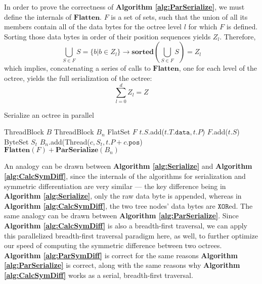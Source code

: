 \documentclass[twoside,twocolumn]{article}
\begin{document}
In order to prove the correctness of \textbf{Algorithm \ref{alg:ParSerialize}}, we must define the
internals of $\mathbf{Flatten}$. $F$ is a set of sets, such that the union of all its members contain all
of the data bytes for the octree level $l$ for which $F$ is defined. Sorting those data bytes in order
of their position sequences yields $Z_l$. Therefore,
$$\bigcup_{S \in F} S = \{b | b \in Z_l\} \rightarrow \mathbf{sorted}(\bigcup_{S \in F} S) = Z_l$$
which implies, concatenating a series of calls to $\mathbf{Flatten}$, one for each level of the octree,
yields the full serialization of the octree:
$$\sum_{l = 0}^d Z_l = Z$$

\begin{algorithm}[h]
\small
\caption{Serialize an octree in parallel}
\label{alg:ParSerialize}
\begin{algorithmic}[1]
   {ThreadBlock $B$}
    \State ThreadBlock $B_n$
    \State FlatSet $F$
        \State $t.S.$add($t.T.\mathtt{data}, t.P$)
        \State $F$.add($t.S$)
        \State ByteSet $S_t$
          \State $B_n.$add(Thread($c, S_t, t.P + c.\mathtt{pos}$)
        \EndFor
      \EndIf
    \EndFor
    \State \Return $\mathbf{Flatten}(F) + \mathbf{ParSerialize}(B_n)$
  \EndProcedure
\Statex
\end{algorithmic}
  \vspace{-0.4cm}
\end{algorithm}

An analogy can be drawn between \textbf{Algorithm \ref{alg:Serialize}} and
\textbf{Algorithm \ref{alg:CalcSymDiff}}, since the internals of the algorithms for serialization and
symmetric differentiation are very similar --- the key difference being in
\textbf{Algorithm \ref{alg:Serialize}}, only the raw data byte is appended, whereas in
\textbf{Algorithm \ref{alg:CalcSymDiff}}, the two tree nodes' data bytes are $\mathtt{XOR}$ed. The same
analogy can be drawn between \textbf{Algorithm \ref{alg:ParSerialize}}. Since
\textbf{Algorithm \ref{alg:CalcSymDiff}} is also a breadth-first traversal, we can apply this parallelized
breadth-first traversal paradigm here, as well, to further optimize our speed of computing the symmetric
difference between two octrees. \textbf{Algorithm \ref{alg:ParSymDiff}} is correct for the same reasons 
\textbf{Algorithm \ref{alg:ParSerialize}} is correct, along with the same reasons why
\textbf{Algorithm \ref{alg:CalcSymDiff}} works as a serial, breadth-first traversal.
\end{document}
